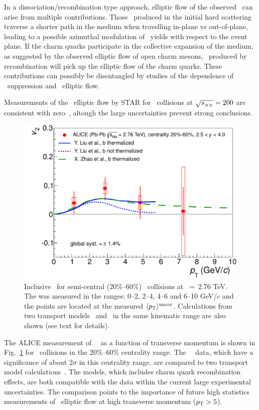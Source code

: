 In a dissociation/recombination type approach, elliptic flow of the observed \jpsi\ can arise from multiple 
contributions. Those \jpsi\ produced in the initial hard scattering traverse a shorter path in the medium when 
travelling in-plane vs out-of-plane, leading to a possible azimuthal modulation of \jpsi\ yields with respect
to the event plane. If the charm quarks participate in the collective expansion of the medium, as 
suggested by the observed elliptic flow of open charm mesons, \jpsi\ produced by recombination will 
pick up the elliptic flow of the charm quarks. These contributions can possibly be disentangled by 
studies of the \pt dependence of \jpsi\ suppression and \jpsi\ elliptic flow.

Measurements of the \jpsi\ elliptic flow by STAR for \AuAu\ collisions at $\sqrt{s_{_{NN}}} = 200$\GeV 
are consistent with zero~\cite{Adamczyk:2012pw}, altough the large uncertainties prevent strong conclusions.

\begin{figure}
\includegraphics[width=0.49\linewidth]{qqbarfigures/prl_fig4-eps-converted-to.pdf}
\caption{\label{fig:GR:v2ptcomp} Inclusive \jpsi\ \vpt  for semi-central (20\%--60\%) \PbPb\ collisions at \rootsNN~=~2.76 TeV. The \vtwo was measured in the \pt ranges: 0--2, 2--4, 4--6 and 6--10 GeV/$c$ and the points are located at the measured  $\langle p_{\rm T} \rangle^{\rm uncor}$. Calculations from two transport models~\cite{Liu:2009gx} and~\cite{Zhao:2012gc} in the same kinematic range are also shown (see text for details).}
\end{figure}

The ALICE measurement of \jpsi\ \vtwo\ as a function of transverse momentum is shown in Fig.~\ref{fig:GR:v2ptcomp} for \PbPb\ collisions
in the 20\%--60\% centrality range.
The \jpsi\ \vtwo\ data, which have a significance of about 2$\sigma$ in this centrality range, are compared to two 
transport model calculations~\cite{Liu:2009gx,Zhao:2012gc}. The models, which includes charm quark recombination effects, 
are both compatible with the data within the current large experimental uncertainties. The comparison points to the 
importance of future high statistics measurements of \jpsi\ elliptic flow at high transverse momentum ($p_{\rm{T}} > 5$\GeVc).


